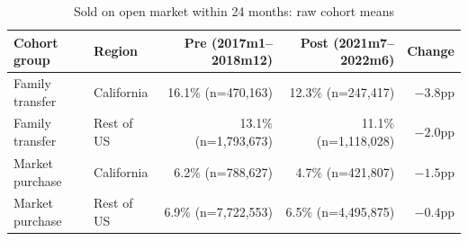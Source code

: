 \begin{table}[!ht]\centering
\caption{Sold on open market within 24 months: raw cohort means}
\label{tab:raw22}
{\small
\begin{tabular}{llrrr}
\toprule
Cohort group & Region & Pre (2017m1--2018m12) & Post (2021m7--2022m6) & Change \\
\midrule
Family transfer & California & 16.1\% \; (n=470{,}163) & 12.3\% \; (n=247{,}417) & $-3.8$pp \\
Family transfer & Rest of US & 13.1\% \; (n=1{,}793{,}673) & 11.1\% \; (n=1{,}118{,}028) & $-2.0$pp \\
Market purchase & California & 6.2\% \; (n=788{,}627) & 4.7\% \; (n=421{,}807) & $-1.5$pp \\
Market purchase & Rest of US & 6.9\% \; (n=7{,}722{,}553) & 6.5\% \; (n=4{,}495{,}875) & $-0.4$pp \\
\bottomrule
\end{tabular}}
\begin{minipage}{0.95\textwidth}\end{minipage}
\end{table}
